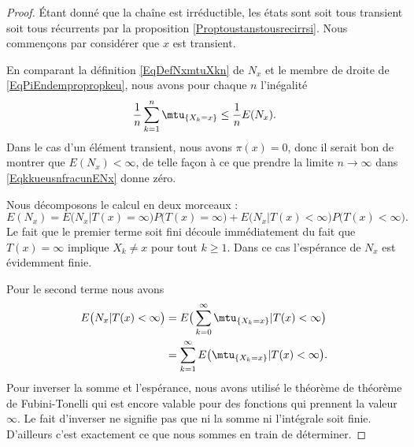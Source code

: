 \begin{proof}
    Étant donné que la chaîne est irréductible, les états sont soit tous transient soit tous récurrents par la proposition \ref{Proptoustanstousrecirrsi}. Nous commençons par considérer que \( x\) est transient.

    En comparant la définition \eqref{EqDefNxmtuXkn} de \( N_x\) et le membre de droite de \eqref{EqPiEndempropropkeu}, nous avons pour chaque \( n\) l'inégalité
    \begin{equation}    \label{EqkkueusnfracunENx}
        \frac{1}{ n }\sum_{k=1}^n\mtu_{\{ X_k=x \}}\leq\frac{1}{ n }E(N_x).
    \end{equation}
    Dans le cas d'un élément transient, nous avons \( \pi(x)=0\), donc il serait bon de montrer que \( E(N_x)<\infty\), de telle façon à ce que prendre la limite \( n\to\infty\) dans \eqref{EqkkueusnfracunENx} donne zéro.

    Nous décomposons le calcul en deux morceaux :
    \begin{equation}
        E(N_x)=E\big( N_x|T(x)=\infty \big)P\big( T(x)=\infty \big)+E\big( N_x|T(x)<\infty \big)P\big( T(x)<\infty \big).
    \end{equation}
    Le fait que le premier terme soit fini découle immédiatement du fait que \( T(x)=\infty\) implique \( X_k\neq x\) pour tout \( k\geq 1\). Dans ce cas l'espérance de \( N_x\) est évidemment finie.

    Pour le second terme nous avons
    \begin{subequations}
        \begin{align}
            E\big( N_x|T(x)<\infty \big)&=E\big( \sum_{k=0}^{\infty}\mtu_{\{ X_k=x \}}|T(x)<\infty \big)\\
            &=\sum_{k=1}^{\infty}E\big( \mtu_{\{ X_k=x \}}|T(x)<\infty \big).
        \end{align}
    \end{subequations}
    Pour inverser la somme et l'espérance, nous avons utilisé le théorème de théorème de Fubini-Tonelli qui est encore valable pour des fonctions qui prennent la valeur \( \infty\). Le fait d'inverser ne signifie pas que ni la somme ni l'intégrale soit finie. D'ailleurs c'est exactement ce que nous sommes en train de déterminer.


\end{proof}
